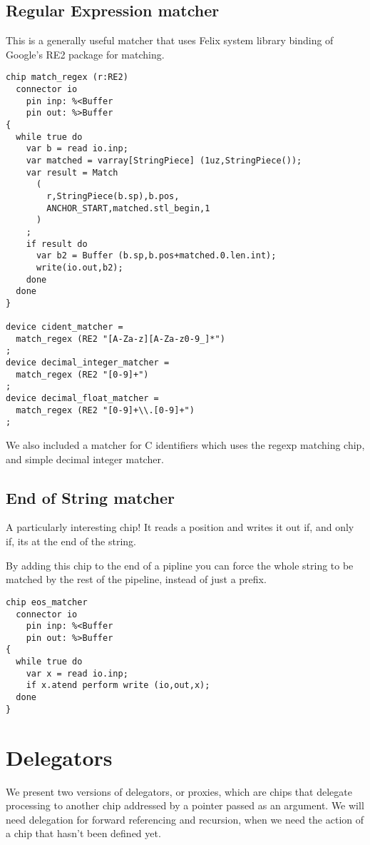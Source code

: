 \documentclass[oneside]{book}
\begin{document}
\subsection{Regular Expression matcher}
This is a generally useful matcher that uses
Felix system library binding of Google's RE2 package for matching. 

\begin{verbatim}
chip match_regex (r:RE2)
  connector io
    pin inp: %<Buffer
    pin out: %>Buffer
{
  while true do
    var b = read io.inp;
    var matched = varray[StringPiece] (1uz,StringPiece());
    var result = Match
      (
        r,StringPiece(b.sp),b.pos,
        ANCHOR_START,matched.stl_begin,1
      )
    ;
    if result do
      var b2 = Buffer (b.sp,b.pos+matched.0.len.int);
      write(io.out,b2);
    done
  done
}

device cident_matcher = 
  match_regex (RE2 "[A-Za-z][A-Za-z0-9_]*")
;
device decimal_integer_matcher = 
  match_regex (RE2 "[0-9]+")
;
device decimal_float_matcher = 
  match_regex (RE2 "[0-9]+\\.[0-9]+")
;
\end{verbatim}

We also included a matcher for C identifiers which uses the regexp
matching chip, and simple decimal integer matcher.


\subsection{End of String matcher}
A particularly interesting chip! It reads a position
and writes it out if, and only if, its at the end of the 
string.

By adding this chip to the end of a pipline you can force
the whole string to be matched by the rest of the pipeline,
instead of just a prefix.

\begin{verbatim}
chip eos_matcher 
  connector io
    pin inp: %<Buffer
    pin out: %>Buffer
{
  while true do
    var x = read io.inp;
    if x.atend perform write (io,out,x);
  done
}
\end{verbatim}

\section{Delegators}
We present two versions of delegators, or proxies, which are chips that delegate
processing to another chip addressed by a pointer passed as an argument.
We will need delegation for forward referencing and recursion, when we need
the action of a chip that hasn't been defined yet.
\end{document}
